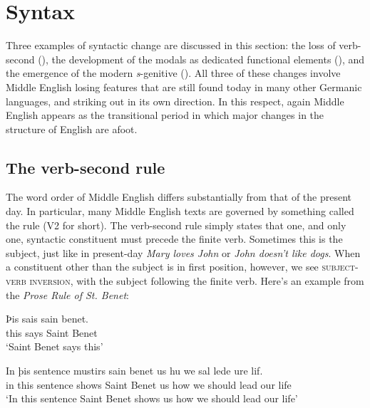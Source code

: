 \section{Syntax}

Three examples of syntactic change are discussed in this section: the loss of verb-second (), the development of the modals as dedicated functional elements (), and the emergence of the modern \emph{s}-genitive (). All three of these changes involve Middle English losing features that are still found today in many other Germanic languages, and striking out in its own direction. In this respect, again Middle English appears as the transitional period in which major changes in the structure of English are afoot.

\subsection{The verb-second rule}\label{ME-V2}

The word order of Middle English differs substantially from that of the present day. In particular, many Middle English texts are governed by something called the  rule (V2 for short). The verb-second rule simply states that one, and only one, syntactic constituent must precede the finite verb. Sometimes this is the subject, just like in present-day \emph{Mary loves John} or \emph{John doesn't like dogs}. When a constituent other than the subject is in first position, however, we see \textsc{subject-verb inversion}, with the subject following the finite verb. Here's an example from the \emph{Prose Rule of St. Benet}:

\begin{exe}
\ex
\gll Þis sais sain benet.\\
this says Saint Benet \\
\trans `Saint Benet says this'
\label{benet}
\end{exe}

\begin{exe}
\ex
\gll In þis sentence mustirs sain benet us hu we sal lede ure lif.\\
in this sentence shows Saint Benet us how we should lead our life\\
\trans `In this sentence Saint Benet shows us how we should lead our life'
\label{benet2}
\end{exe}

